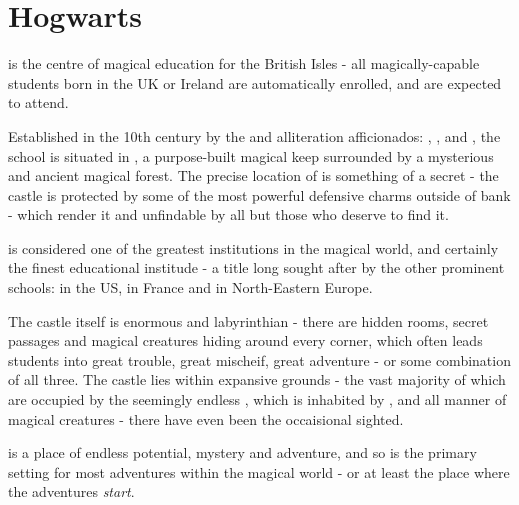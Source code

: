 \chapter{Hogwarts}

 is the centre of magical education for the British Isles - all magically-capable students born in the UK or Ireland are automatically enrolled, and are expected to attend. 

Established in the 10th century by the  and alliteration afficionados: , ,  and , the school is situated in , a purpose-built magical keep surrounded by a mysterious and ancient magical forest. The precise location of  is something of a secret - the castle is protected by some of the most powerful defensive charms outside of  bank - which render it  and unfindable by all but those who deserve to find it. 

 is considered one of the greatest institutions in the magical world, and certainly the finest educational institude - a title long sought after by the other prominent schools:  in the US,  in France and  in North-Eastern Europe. 

The castle itself is enormous and labyrinthian - there are hidden rooms, secret passages and magical creatures hiding around every corner, which often leads students into great trouble, great mischeif, great adventure - or some combination of all three. The castle lies within expansive grounds - the vast majority of which are occupied by the seemingly endless , which is inhabited by ,  and all manner of magical creatures - there have even been the occaisional  sighted. 
 
 is a place of endless potential, mystery and adventure, and so is the primary setting for most adventures within the magical world - or at least the place where the adventures {\it start}. 



